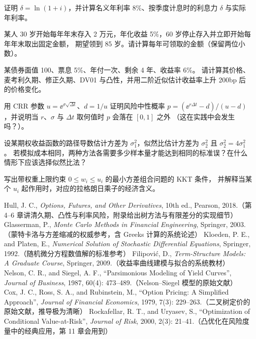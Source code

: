 \begin{exercises}
\item 证明 $\delta = \ln(1+i)$，并计算名义年利率 8\%、按季度计息时的利息力 $\delta$ 与实际年利率。

\item 某人 30 岁开始每年年末存入 2 万元，年化收益 5\%，60 岁停止存入并立即开始每年年末取出固定金额，
期望领到 85 岁。请计算每年可领取的金额（保留两位小数）。

\item 某债券面值 100、票息 5\%、年付一次、剩余 4 年、收益率 6\%。
请计算其价格、麦考利久期、修正久期、DV01 与凸性，并用二阶近似估计收益率上升 200bp 后的价格变化。

\item 用 CRR 参数 $u=\ee^{\sigma\sqrt{\Delta t}}$、$d=1/u$ 证明风险中性概率
$p=(\ee^{r\Delta t}-d)/(u-d)$，并说明当 $r$、$\sigma$ 与 $\Delta t$ 取何值时 $p$ 会落在 $[0,1]$ 之外
（这在实践中会发生吗？）。

\item 设某期权收益函数的路径导数估计方差为 $\sigma_1^2$，似然比估计方差为 $\sigma_2^2$ 且 $\sigma_2^2 = 4\sigma_1^2$。
若模拟成本相同，两种方法各需要多少样本量才能达到相同的标准误？在什么情形下应该选择似然比法？

\item 写出带权重上限约束 $0\le w_i\le u_i$ 的最小方差组合问题的 KKT 条件，
并解释当某个 $u_i$ 起作用时，对应的拉格朗日乘子的经济含义。
\end{exercises}

\begin{furtherreading}
 Hull, J. C., \emph{Options, Futures, and Other Derivatives}, 10th ed., Pearson, 2018.（第 4--6 章讲清久期、凸性与利率风险，附录给出树方法与有限差分的实现细节）
 Glasserman, P., \emph{Monte Carlo Methods in Financial Engineering}, Springer, 2003.（蒙特卡洛与方差缩减的权威参考，含 Greeks 计算的系统论述）
 Kloeden, P. E., and Platen, E., \emph{Numerical Solution of Stochastic Differential Equations}, Springer, 1992.（随机微分方程数值解的标准参考）
 Filipovi\'c, D., \emph{Term-Structure Models: A Graduate Course}, Springer, 2009.（收益率曲线建模与拟合的系统教材）
 Nelson, C. R., and Siegel, A. F., ``Parsimonious Modeling of Yield Curves'', \emph{Journal of Business}, 1987, 60(4): 473--489.（Nelson--Siegel 模型的原始文献）
 Cox, J. C., Ross, S. A., and Rubinstein, M., ``Option Pricing: A Simplified Approach'', \emph{Journal of Financial Economics}, 1979, 7(3): 229--263.（二叉树定价的原始文献，推导极为清晰）
 Rockafellar, R. T., and Uryasev, S., ``Optimization of Conditional Value-at-Risk'', \emph{Journal of Risk}, 2000, 2(3): 21--41.（凸优化在风险度量中的经典应用，第 11 章会用到）
\end{furtherreading}
